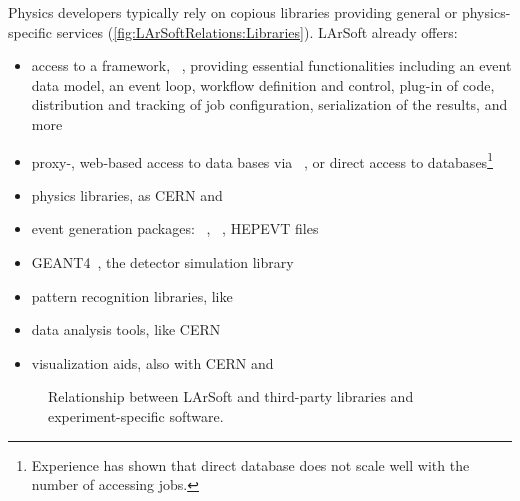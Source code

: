 Physics developers typically rely on copious libraries providing general or physics-specific services
(\cref{fig:LArSoftRelations:Libraries}).
LArSoft already offers:
\begin{itemize}
	\item access to a framework, \ART~\cite{ART}, providing essential functionalities
		including an event data model, an event loop, workflow definition and control,
		plug-in of code, distribution and tracking of job configuration,
		serialization of the results, and more
	\item proxy-, web-based access to data bases via \libwda~\cite{libwda},
		or direct access to \PostgreSQL databases\footnote{%
		Experience has shown that direct database does not scale well with the number of accessing jobs.%
		}
	\item physics libraries, as CERN \CLHEP and \nutools~\cite{nutools}
	\item event generation packages: \GENIE~\cite{GENIE}, \CRY~\cite{CRY}, HEPEVT files
	\item GEANT4~\cite{GEANT}, the detector simulation library
	\item pattern recognition libraries, like \Pandora
	\item data analysis tools, like CERN \ROOT~\cite{ROOT}
	\item visualization aids, also with CERN \ROOT and \nutools
\end{itemize}
\begin{figure}
	\caption{\label{fig:LArSoftRelationsI}
		Relationship between LArSoft and \protect{} third-party libraries and \protect{} experiment-specific software.
	}
\end{figure}

